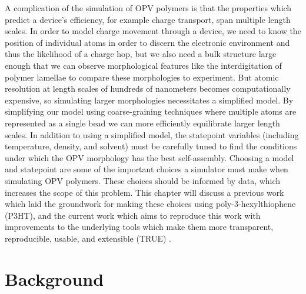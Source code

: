 A complication of the simulation of OPV polymers is that the properties which predict a device's efficiency, for example charge transport, span multiple length scales.
In order to model charge movement through a device, we need to know the position of individual atoms in order to discern the electronic environment and thus the likelihood of a charge hop, but we also need a bulk structure large enough that we can observe morphological features like the interdigitation of polymer lamellae to compare these morphologies to experiment.
But atomic resolution at length scales of hundreds of nanometers becomes computationally expensive, so simulating larger morphologies necessitates a simplified model.
By simplifying our model using coarse-graining techniques where multiple atoms are represented as a single bead we can more efficiently equilibrate larger length scales.
In addition to using a simplified model, the statepoint variables (including temperature, density, and solvent) must be carefully tuned to find the conditions under which the OPV morphology has the best self-assembly. 
Choosing a model and statepoint are some of the important choices a simulator must make when simulating OPV polymers. 
These choices should be informed by data, which increases the scope of this problem.
This chapter will discuss a previous work which laid the groundwork for making these choices using poly-3-hexylthiophene (P3HT), and the current work which aims to reproduce this work with improvements to the underlying tools which make them more transparent, reproducible, usable, and extensible (TRUE) \citep{Thompson2020}.

\section{Background} 


